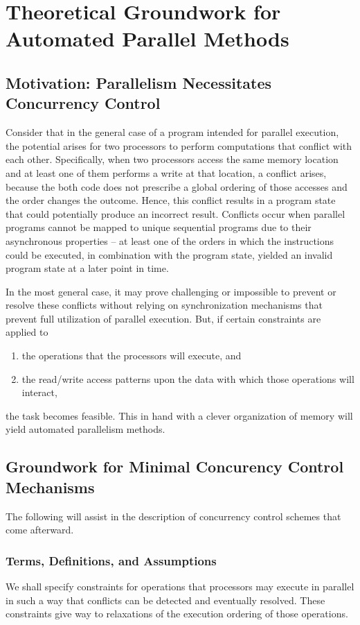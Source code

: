 \chapter{Theoretical Groundwork for Automated Parallel Methods}

\section{Motivation: Parallelism Necessitates Concurrency Control}
Consider that in the general case of a program intended for parallel execution,
the potential arises for two processors to perform computations that conflict
with each other. Specifically, when two processors access the same memory
location and at least one of them performs a write at that location, a conflict
arises, because the both code does not prescribe a global ordering of those
accesses and the order changes the outcome. Hence, this conflict results in a
program state that could potentially produce an incorrect result. Conflicts
occur when parallel programs cannot be mapped to unique sequential programs due
to their asynchronous properties -- at least one of the orders in which the
instructions could be executed, in combination with the program state, yielded
an invalid program state at a later point in time.

In the most general case, it may prove challenging or impossible to prevent or
resolve these conflicts without relying on synchronization mechanisms that
prevent full utilization of parallel execution. But, if certain constraints are
applied to
\begin{enumerate}
    \item the operations that the processors will execute, and
    \item the read/write access patterns upon the data with which those
        operations will interact,
\end{enumerate}

the task becomes feasible. This in hand with a clever organization of memory
will yield automated parallelism methods.

\section{Groundwork for Minimal Concurency Control Mechanisms}
The following will assist in the description of concurrency control schemes that
come afterward.

\subsection{Terms, Definitions, and Assumptions}
We shall specify constraints for operations that processors may execute in
parallel in such a way that conflicts can be detected and eventually resolved.
These constraints give way to relaxations of the execution ordering of those
operations.

